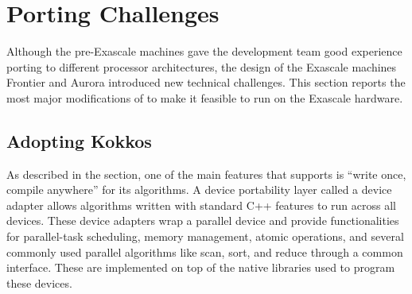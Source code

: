 \section{Porting Challenges}

Although the pre-Exascale machines gave the \vtkm development team good experience porting to different processor architectures, the design of the Exascale machines Frontier and Aurora introduced new technical challenges.
This section reports the most major modifications of \vtkm to make it feasible to run on the Exascale hardware.


\subsection{Adopting Kokkos}
\label{sec:adopting-kokkos}


As described in the  section,
one of the main features that \vtkm supports is ``write once, compile anywhere'' for its algorithms.
A device portability layer called a device adapter allows algorithms written with standard C++ features to run across all devices.
These device adapters wrap a parallel device and provide functionalities for parallel-task scheduling, memory management, atomic operations, and several commonly used parallel algorithms like scan, sort, and reduce through a common interface.
These are implemented on top of the native libraries used to program these devices.

